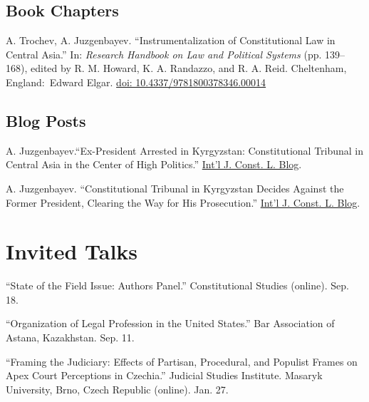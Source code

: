 \documentclass[11pt,letterpaper]{report}
\begin{document}
    \subsection*{Book Chapters}

    \begin{tablist}

        \item[2023] \tab{}A. Trochev, A. Juzgenbayev. \enquote{Instrumentalization of Constitutional Law in Central Asia.} In: \textit{Research Handbook on Law and Political Systems} (pp. 139--168), edited by R. M. Howard, K. A. Randazzo, and  R. A. Reid. Cheltenham, England:\ Edward Elgar. \href{https://doi.org/10.4337/9781800378346.00014}{doi: 10.4337/9781800378346.00014}

    \end{tablist}

    \subsection*{Blog Posts}

    \begin{tablist}
        
        \item[2019] \tab{}A. Juzgenbayev.\enquote{Ex-President Arrested in Kyrgyzstan: Constitutional Tribunal in Central Asia in the Center of High Politics.} \href{http://www.iconnectblog.com/2019/08/ex-president-arrested-in-kyrgyzstan-constitutional-tribunal-in-central-asia-in-the-center-of-high-politics/}{Int’l J. Const. L. Blog}. 
        \item[2019] \tab{}A. Juzgenbayev. \enquote{Constitutional Tribunal in Kyrgyzstan Decides Against the Former President, Clearing the Way for His Prosecution.} \href{http://www.iconnectblog.com/2019/11/constitutional-tribunal-in-kyrgyzstan-decides-against-the-former-president-clearing-the-way-for-his-prosecution/}{Int’l J. Const. L. Blog}.
    \end{tablist}


    \section*{Invited Talks}

   \begin{tablist}
    \item[2025] \tab{}\enquote{State of the Field Issue: Authors Panel.} Constitutional Studies (online). Sep. 18.
    \item[2025] \tab{}\enquote{Organization of Legal Profession in the United States.} Bar Association of Astana, Kazakhstan. Sep. 11.
    \item[2025] \tab{}\enquote{Framing the Judiciary: Effects of Partisan, Procedural, and Populist Frames on Apex Court Perceptions in Czechia.} Judicial Studies Institute. Masaryk University, Brno, Czech Republic (online). Jan. 27.

    \end{tablist}
\end{document}
